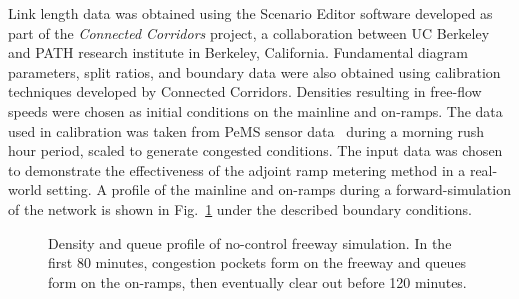 Link length data was obtained using the Scenario Editor software developed
as part of the \textit{Connected Corridors} project, a collaboration between
UC Berkeley and PATH research institute in Berkeley, California.
Fundamental diagram parameters, split ratios, and boundary data were
also obtained using calibration techniques developed by Connected
Corridors. Densities resulting in free-flow speeds were chosen as
initial conditions on the mainline and on-ramps. The data used in calibration
was taken from PeMS sensor data~\cite{Chen2003} during a morning rush hour period,
scaled to generate congested conditions. The input data was chosen
to demonstrate the effectiveness of the adjoint ramp metering method
in a real-world setting. A profile of the mainline and on-ramps during
a forward-simulation of the network is shown in Fig.~\ref{fig:Density-and-queue}
under the described boundary conditions.
\begin{figure}
\hfill{}
								
\caption{Density and queue profile of no-control freeway simulation. In the
	first 80 minutes, congestion pockets form on the freeway and queues
	form on the on-ramps, then eventually clear out before 120 minutes.\label{fig:Density-and-queue}}
\end{figure}
						
						
						
